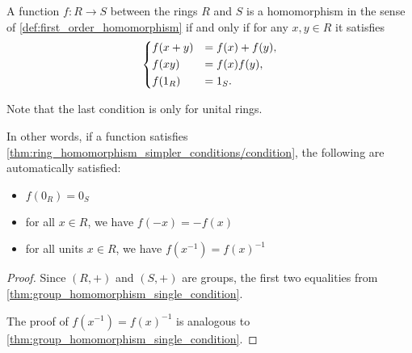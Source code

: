 \begin{proposition}\label{thm:ring_homomorphism_simpler_conditions}
  A function \( f: R \to S \) between the rings \( R \) and \( S \) is a homomorphism in the sense of \cref{def:first_order_homomorphism} if and only if for any \( x, y \in R \) it satisfies
  \begin{equation}\label{thm:ring_homomorphism_simpler_conditions/condition}
    \begin{dcases}
      f(x + y) &= f(x) + f(y), \\
      f(xy) &= f(x) f(y), \\
      f(1_R) &= 1_S.
    \end{dcases}
  \end{equation}

  Note that the last condition is only for unital rings.

  In other words, if a function satisfies \cref{thm:ring_homomorphism_simpler_conditions/condition}, the following are automatically satisfied:
  \begin{itemize}
    \item \( f(0_R) = 0_S \)
    \item for all \( x \in R \), we have \( f(-x) = -f(x) \)
    \item for all units \( x \in R \), we have \( f(x^{-1}) = f(x)^{-1} \)
  \end{itemize}
\end{proposition}
\begin{proof}
  Since \( (R, +) \) and \( (S, +) \) are groups, the first two equalities from \cref{thm:group_homomorphism_single_condition}.

  The proof of \( f(x^{-1}) = f(x)^{-1} \) is analogous to \cref{thm:group_homomorphism_single_condition}.
\end{proof}

